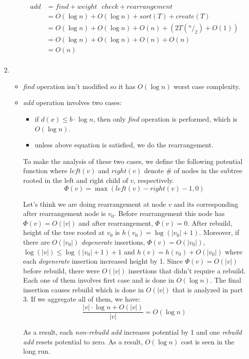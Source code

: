 \begin{enumerate}
\begin{itemize}
    \begin{align*}
      add &= find + weight\text{ }check + rearrangement \\
                  &= O(\log n) + O(\log n) + sort(T) + create(T) \\
                  &= O(\log n) + O(\log n)+ O(n) + (2T(^n/_2) + O(1)) \\
                  &= O(\log n) + O(\log n)+ O(n) + O(n) \\
                  &= O(n) \\
    \end{align*}
  \end{itemize}
  
  \item
  \begin{itemize}
    \item \textit{find} operation isn't modified so it has $O( \log n)$ worst case complexity.
    
    \item \textit{add} operation involves two cases:
      \begin{itemize}
        \item if $d(x) \leq b \cdot \log n$, then only \textit{find} operation is performed, which is $O(\log n)$.
        
        \item unless above equation is satisfied, we do the rearrangement.
      \end{itemize}
      
      To make the analysis of these two cases, we define the following potential function where $left(v)$ and $right(v)$ denote \# of nodes in the subtree rooted in the left and right child of $v$, respectively.
      $$\Phi(v) = \max (left(v) - right(v) - 1, 0)$$
      
      Let's think we are doing rearrangement at node $v$ and its corresponding after rearrangement node is $v_0$. Before rearrangement this node has $\Phi(v) = O(|v|)$ and after rearrangement, $\Phi(v) = 0$. 
      After rebuild, height of the tree rooted at $v_0$ is $h(v_0) = \log(|v_0| + 1)$. Moreover, if there are $O(|v_0|)$ \textit{degenerate} insertions, $\Phi(v) = O(|v_0|)$, $\log(|v|) \leq \log(|v_0| + 1) + 1$ and $h(v) = h(v_0) + O(|v_0|)$ where each \textit{degenerate} insertion increased height by 1. Since $\Phi(v) = O(|v|)$ before rebuild, there were $O(|v|)$ insertions that didn't require a rebuild. Each one of them involves first case and is done in $O(\log n)$. The final insertion causes rebuild which is done in $O(|v|)$ that is analyzed in part 3. If we aggregate all of them, we have:      
      $$
        \frac{|v| \cdot \log n + O(|v|)}{|v|} = O(\log n)      
      $$
      
      As a result, each \textit{non-rebuild add} increases potential by 1 and one \textit{rebuild add} resets potential to zero. As a result, $O(\log n)$ cost is seen in the long run.
  \end{itemize}


\end{enumerate}